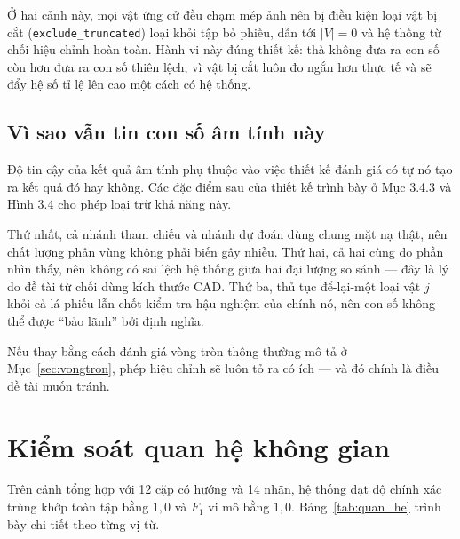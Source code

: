 Ở hai cảnh này, mọi vật ứng cử đều chạm mép ảnh nên bị điều kiện loại vật bị cắt
(\texttt{exclude\-\_truncated}) loại khỏi tập bỏ phiếu, dẫn tới $|V| = 0$ và hệ thống từ chối
hiệu chỉnh hoàn toàn. Hành vi này
đúng thiết kế: thà không đưa ra con số còn hơn đưa ra con số thiên lệch, vì vật bị cắt luôn đo
ngắn hơn thực tế và sẽ đẩy hệ số tỉ lệ lên cao một cách có hệ thống.


\subsection{Vì sao vẫn tin con số âm tính này}

Độ tin cậy của kết quả âm tính phụ thuộc vào việc thiết kế đánh giá có tự nó tạo ra kết quả đó hay không. Các đặc điểm sau của thiết kế trình bày ở Mục 3.4.3 và Hình 3.4 cho phép loại trừ khả năng này.

Thứ nhất, cả nhánh tham chiếu và nhánh dự đoán dùng chung mặt nạ thật, nên chất lượng phân vùng
không phải biến gây nhiễu. Thứ hai, cả hai cùng đo phần nhìn thấy, nên không có sai lệch hệ
thống giữa hai đại lượng so sánh --- đây là lý do đề tài từ chối dùng kích thước CAD. Thứ ba,
thủ tục để-lại-một loại vật $j$ khỏi cả lá phiếu lẫn chốt kiểm tra hậu nghiệm của chính nó, nên
con số không thể được ``bảo lãnh'' bởi định nghĩa.

Nếu thay bằng cách đánh giá vòng tròn thông thường mô tả ở Mục~\ref{sec:vongtron}, phép hiệu
chỉnh sẽ luôn tỏ ra có ích --- và đó chính là điều đề tài muốn tránh.

\section{Kiểm soát quan hệ không gian}

Trên cảnh tổng hợp với 12 cặp có hướng và 14 nhãn, hệ thống đạt độ chính xác trùng khớp toàn tập
bằng $1{,}0$ và $F_1$ vi mô bằng $1{,}0$. Bảng~\ref{tab:quan_he} trình bày chi tiết theo từng vị
từ.

